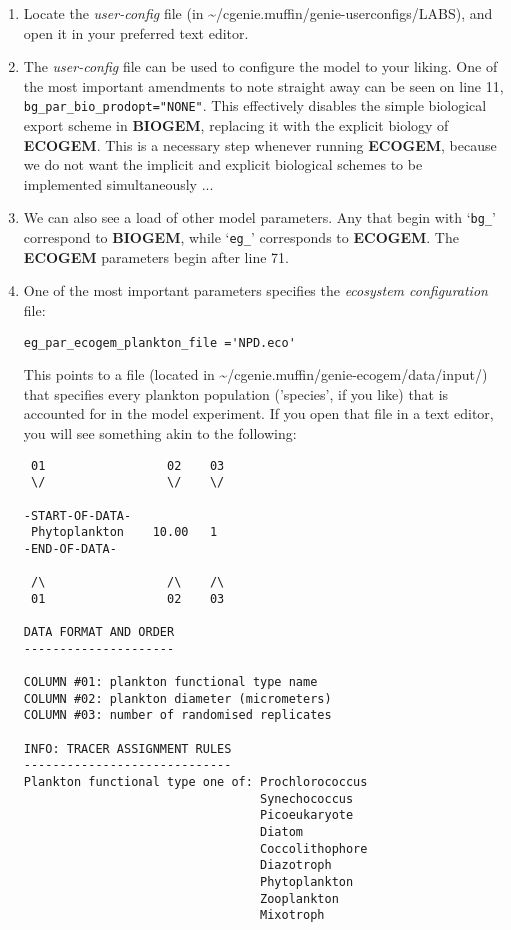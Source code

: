 \documentclass[11pt,fleqn]{book} %
\begin{document}
\begin{enumerate}[noitemsep]
\vspace{1mm}
\item Locate the \textit{user-config} file (in \textsf{\footnotesize \textasciitilde{}/cgenie.muffin/genie-userconfigs/LABS}), and open it in your preferred text editor.
\vspace{1mm}
\item The \textit{user-config} file can be used to configure the model to your liking. One of the most important amendments to note straight away can be seen on line 11, \texttt{bg\_par\_bio\_prodopt="NONE"}. This effectively disables the simple biological export scheme in \textbf{BIOGEM}, replacing it with the explicit biology of \textbf{ECOGEM}. This is a necessary step whenever running \textbf{ECOGEM}, because we do not want the implicit and explicit biological schemes to be implemented simultaneously ...
\vspace{1mm}
\item We can also see a load of other model parameters. Any that begin with `\texttt{bg\_}' correspond to \textbf{BIOGEM}, while `\texttt{eg\_}' corresponds to \textbf{ECOGEM}. The \textbf{ECOGEM} parameters begin after line 71.
\vspace{1mm}
\item One of the most important parameters specifies the \textit{ecosystem configuration} file:
\small\begin{verbatim}
eg_par_ecogem_plankton_file ='NPD.eco'
\end{verbatim}\normalsize

This points to a file (located in \textsf{\footnotesize \textasciitilde{}/cgenie.muffin/genie-ecogem/data/input/}) that specifies every plankton population ('species', if you like) that is accounted for in the model experiment. If you open that file in a text editor, you will see something akin to the following:
\scriptsize\begin{verbatim}
 01                 02    03
 \/                 \/    \/

-START-OF-DATA-
 Phytoplankton    10.00   1
-END-OF-DATA-

 /\                 /\    /\
 01                 02    03

DATA FORMAT AND ORDER
---------------------

COLUMN #01: plankton functional type name
COLUMN #02: plankton diameter (micrometers)
COLUMN #03: number of randomised replicates

INFO: TRACER ASSIGNMENT RULES
-----------------------------
Plankton functional type one of: Prochlorococcus
                                 Synechococcus
                                 Picoeukaryote
                                 Diatom
                                 Coccolithophore
                                 Diazotroph
                                 Phytoplankton
                                 Zooplankton
                                 Mixotroph
\end{verbatim}\normalsize


\end{enumerate}
\end{document}
